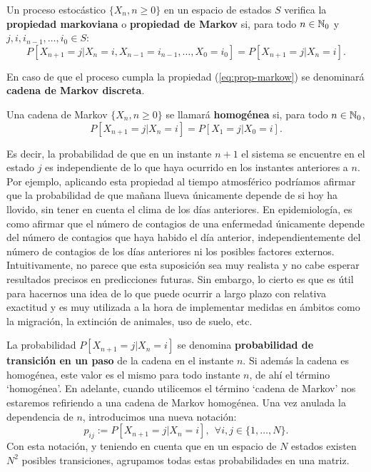 \begin{definicion}
    Un proceso estocástico $\{X_n,n\geq 0\}$ en un espacio de estados $S$ verifica la \textbf{propiedad markoviana} o \textbf{propiedad de Markov} si, para todo $n\in\mathbb{N}_0$ y $j,i,i_{n-1},\dots, i_0 \in S$:
    \begin{equation}
        \label{eq:prop-markow}
        P[X_{n+1}=j | X_n=i, X_{n-1}=i_{n-1}, \dots, X_0=i_0 ] = P[X_{n+1}=j | X_n=i].
    \end{equation}

    En caso de que el proceso cumpla la propiedad (\ref{eq:prop-markow}) se denominará \textbf{cadena de Markov discreta}.

    Una cadena de Markov $\{X_n, n\geq 0\}$ se llamará \textbf{homogénea} si, para todo $n\in\mathbb{N}_0$,
    \begin{equation}
        \label{eq:cad-homogenea}
        P[X_{n+1}=j|X_n=i] = P[X_1=j|X_0=i].
    \end{equation}
\end{definicion}

Es decir, la probabilidad de que en un instante $n+1$ el sistema se encuentre en el estado $j$ es independiente de lo que haya ocurrido en los instantes anteriores a $n$. Por ejemplo, aplicando esta propiedad al tiempo atmosférico podríamos afirmar que la probabilidad de que mañana llueva únicamente depende de si hoy ha llovido, sin tener en cuenta el clima de los días anteriores. En epidemiología, es como afirmar que el número de contagios de una enfermedad únicamente depende del número de contagios que haya habido el día anterior, independientemente del número de contagios de los días anteriores ni los posibles factores externos. Intuitivamente, no parece que esta suposición sea muy realista y no cabe esperar resultados precisos en predicciones futuras. Sin embargo, lo cierto es que es útil para hacernos una idea de lo que puede ocurrir a largo plazo con relativa exactitud y es muy utilizada a la hora de implementar medidas en ámbitos como la migración, la extinción de animales, uso de suelo, etc.

La probabilidad $P[X_{n+1}=j|X_n=i]$ se denomina \textbf{probabilidad de transición en un paso} de la cadena en el instante $n$. Si además la cadena es homogénea, este valor es el mismo para todo instante $n$, de ahí el término `homogénea'. En adelante, cuando utilicemos el término `cadena de Markov' nos estaremos refiriendo a una cadena de Markov homogénea. Una vez anulada la dependencia de $n$, introducimos una nueva notación:
$$
p_{ij} := P[X_{n+1}=j|X_n=i], \ \ \forall i,j \in \{1,\dots,N\}.
$$
Con esta notación, y teniendo en cuenta que en un espacio de $N$ estados existen $N^2$ posibles transiciones, agrupamos todas estas probabilidades en una matriz.

